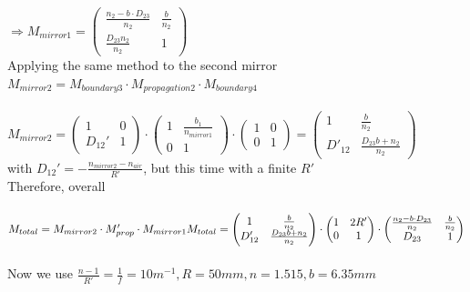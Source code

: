 \documentclass{article}
\begin{document}
$\Rightarrow{} M_{mirror 1}=\begin{pmatrix}
\frac{n_2-b \cdot D_{23}}{n_2} & \frac{b}{n_2}\\
\frac{D_{23}n_2}{n_2} & 1
\end{pmatrix}$
\\
Applying the same method to the second mirror
\\

$M_{mirror 2}= M_{boundary 3} \cdot M_{propagation 2} \cdot M_{boundary 4}$
\\\\
$M_{mirror 2} = \begin{pmatrix}
1 & 0\\
D_{12}' & 1
\end{pmatrix} \cdot \begin{pmatrix}
1 & \frac{b_1}{n_{mirror 1}}\\
0 & 1
\end{pmatrix} \cdot \begin{pmatrix}
1 & 0\\
0 & 1
\end{pmatrix}=\begin{pmatrix}
1 & \frac{b}{n_2}\\
D'_{12} & \frac{D_{23}b+n_2}{n_2}
\end{pmatrix}$
\\
with $ D_{12}' = -\frac{n_{mirror 2}-n_{air}}{R'}$, but this time with a finite $R'$
\\

Therefore, overall
\\\\
$M_{total}= M_{mirror 2} \cdot M'_{prop} \cdot M_{mirror 1}  
\\\\
M_{total}= \begin{pmatrix}
1 & \frac{b}{n_2}\\
D'_{12} & \frac{D_{23}b+n_2}{n_2}
\end{pmatrix}
\cdot
\begin{pmatrix}
1 & 2R'\\
0 & 1
\end{pmatrix} \cdot
\begin{pmatrix}
\frac{n_2-b \cdot D_{23}}{n_2} & \frac{b}{n_2}\\
D_{23} & 1
\end{pmatrix} 
$
\\\\
Now we use $\frac{n-1}{R'} = \frac{1}{f} = 10 m^{-1}, R = 50mm, n=1.515, b=6.35mm $
\end{document}
